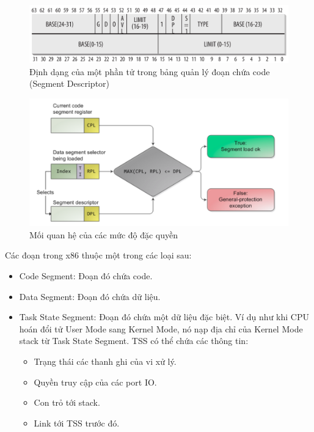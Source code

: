 \documentclass[12pt]{report}
\begin{document}
\begin{figure}[h]
\centering
\caption{Định dạng của một phần tử trong bảng quản lý đoạn chứa code (Segment Descriptor)}
\includegraphics[width=\textwidth]{code_segment.png}
\end{figure}

\begin{figure}[h]
\centering
\caption{Mối quan hệ của các mức độ đặc quyền}
\includegraphics[width=12cm]{plevel.png}
\end{figure}

Các đoạn trong x86 thuộc một trong các loại sau:
\begin{itemize}
\item Code Segment: Đoạn đó chứa code.
\item Data Segment: Đoạn đó chứa dữ liệu. 
\item Task State Segment: Đoạn đó chứa một dữ liệu đặc biệt. Ví dụ như khi CPU hoán đổi tử User Mode sang Kernel Mode, nó nạp địa chỉ của Kernel Mode stack từ Task State Segment. TSS có thể chứa các thông tin: \cite{task_state_segment}
\begin{itemize}
\item Trạng thái các thanh ghi của vi xử lý. 
\item Quyền truy cập của các port IO. 
\item Con trỏ tới stack. 
\item Link tới TSS trước đó. 
\end{itemize}
\end{itemize}
\end{document}
